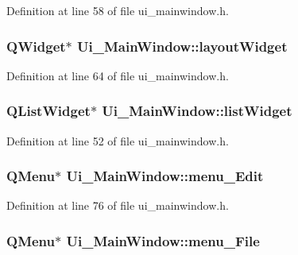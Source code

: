 Definition at line 58 of file ui\_\-mainwindow.h.

\hypertarget{classUi__MainWindow_ab96ab0f0578098521fa69a75aa5cdde8}{
\subsubsection[{layoutWidget}]{\setlength{\rightskip}{0pt plus 5cm}QWidget$\ast$ {\bf Ui\_\-MainWindow::layoutWidget}}}
\label{classUi__MainWindow_ab96ab0f0578098521fa69a75aa5cdde8}


Definition at line 64 of file ui\_\-mainwindow.h.

\hypertarget{classUi__MainWindow_ae647a15635ba8a0e5d5aec475db99d8f}{
\subsubsection[{listWidget}]{\setlength{\rightskip}{0pt plus 5cm}QListWidget$\ast$ {\bf Ui\_\-MainWindow::listWidget}}}
\label{classUi__MainWindow_ae647a15635ba8a0e5d5aec475db99d8f}


Definition at line 52 of file ui\_\-mainwindow.h.

\hypertarget{classUi__MainWindow_a11f322f3af9857e5138c8024d84d0279}{
\subsubsection[{menu\_\-Edit}]{\setlength{\rightskip}{0pt plus 5cm}QMenu$\ast$ {\bf Ui\_\-MainWindow::menu\_\-Edit}}}
\label{classUi__MainWindow_a11f322f3af9857e5138c8024d84d0279}


Definition at line 76 of file ui\_\-mainwindow.h.

\hypertarget{classUi__MainWindow_a6d6a92a6bccde97ab13fce9014eb25d4}{
\subsubsection[{menu\_\-File}]{\setlength{\rightskip}{0pt plus 5cm}QMenu$\ast$ {\bf Ui\_\-MainWindow::menu\_\-File}}}
\label{classUi__MainWindow_a6d6a92a6bccde97ab13fce9014eb25d4}


